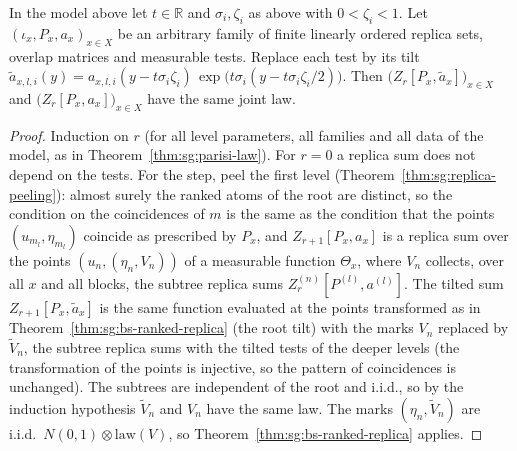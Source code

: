 \begin{theorem}\label{thm:sg:bs-replica}
  \leanok
In the model above let $t\in\mathbb R$ and $\sigma_i,\zeta_i$ as above with $0<\zeta_i<1$. Let $(\iota_x,P_x,a_x)_{x\in X}$ be an
arbitrary family of finite linearly ordered replica sets, overlap matrices and measurable tests. Replace each test by its
tilt $\tilde a_{x,l,i}(y)=a_{x,l,i}(y-t\sigma_i\zeta_i)\,\exp\big(t\sigma_i(y-t\sigma_i\zeta_i/2)\big)$. Then
$\big(Z_r[P_x,\tilde a_x]\big)_{x\in X}$ and $\big(Z_r[P_x,a_x]\big)_{x\in X}$ have the same joint law.
\end{theorem}
\begin{proof}
  \leanok
Induction on $r$ (for all level parameters, all families and all data of the model, as in Theorem~\ref{thm:sg:parisi-law}). For $r=0$ a
replica sum does not depend on the tests. For the step, peel the first level (Theorem~\ref{thm:sg:replica-peeling}): almost surely
the ranked atoms of the root are distinct, so the condition on the coincidences of $m$ is the same as the condition that the
points $(u_{m_l},\eta_{m_l})$ coincide as prescribed by $P_x$, and $Z_{r+1}[P_x,a_x]$ is a replica sum over the points
$(u_n,(\eta_n,V_n))$ of a measurable function $\Theta_x$, where $V_n$ collects, over all $x$ and all blocks, the subtree replica sums
$Z_r^{(n)}[P^{(l)},a^{(l)}]$. The tilted sum $Z_{r+1}[P_x,\tilde a_x]$ is the same function
evaluated at the points transformed as in Theorem~\ref{thm:sg:bs-ranked-replica} (the root tilt) with the marks
$V_n$ replaced by $\tilde V_n$, the subtree replica sums with the tilted tests of the deeper levels (the transformation of the
points is injective, so the pattern of coincidences is unchanged). The subtrees are independent of the root and i.i.d., so by the induction
hypothesis $\tilde V_n$ and $V_n$ have the same law. The marks $(\eta_n,\tilde V_n)$ are i.i.d.\ $N(0,1)\otimes\mathrm{law}(V)$, so Theorem~\ref{thm:sg:bs-ranked-replica} applies.
\end{proof}

